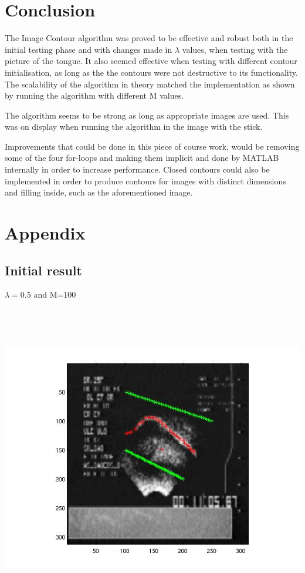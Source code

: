 \documentclass[12pt,a4paper,twocolumn]{article}
\begin{document}
\section{Conclusion}
The Image Contour algorithm was proved to be effective and robust both in the initial testing phase and with changes made in $\lambda$ values, when testing with the picture of the tongue. It also seemed effective when testing with different contour initialisation, as long as the the contours were not destructive to its functionality. The scalability of the algorithm in theory matched the implementation as shown by running the algorithm with different M values. 

The algorithm seems to be strong as long as appropriate images are used. This was on display when running the algorithm in the image with the stick.

Improvements that could be done in this piece of course work, would be removing some of the four for-loops and making them implicit and done by MATLAB internally in order to increase performance. Closed contours could also be implemented in order to produce contours for images with distinct dimensions and filling inside, such as the aforementioned image.

\newpage
\mbox{}
\newpage
\mbox{}
\section{Appendix}
\subsection{Initial result}
$\lambda=0.5$ and M=100
\newline
\includegraphics[width=500pt,height=400pt,scale=1]{points_1_to_7.jpg}
\newpage
\mbox{}
\newpage
\end{document}
